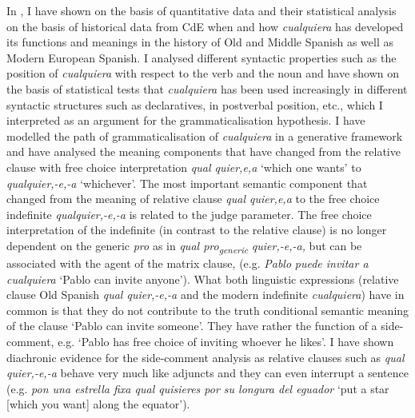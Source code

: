   In , I have shown on the basis of quantitative data and their statistical analysis on the basis of historical data from CdE when and how \textit{cualquiera} has developed its functions and meanings in the history of Old and Middle Spanish as well as Modern European Spanish. I analysed different syntactic properties such as the position of \textit{cualquiera} with respect to the verb and the noun and have shown on the basis of statistical tests that \textit{cualquiera} has been used increasingly in different syntactic structures such as declaratives, in postverbal position, etc., which I interpreted as an argument for the grammaticalisation hypothesis. I have modelled the path of grammaticalisation of \textit{cualquiera} in a generative framework and have analysed the meaning components that have changed from the relative clause with free choice interpretation \textit{qual quier,e,a} ‘which one wants’ to \textit{qualquier,-e,-a} ‘whichever’. The most important semantic component that changed from the meaning of relative clause \textit{qual quier,e,a} to the free choice indefinite \textit{qualquier,-e,-a} is related to the judge parameter. The free choice interpretation of the indefinite (in contrast to the relative clause) is no longer dependent on the generic \textit{pro} as in \textit{qual pro\textsubscript{generic}} \textit{quier,-e,-a,} but can be associated with the agent of the matrix clause, (e.g. \textit{Pablo} \textit{puede invitar a cualquiera} ‘Pablo can invite anyone’). What both linguistic expressions (relative clause Old Spanish \textit{qual quier,-e,-a} and the modern indefinite \textit{cualquiera}) have in common is that they do not contribute to the truth conditional semantic meaning of the clause ‘Pablo can invite someone’. They have rather the function of a side-comment, e.g. ‘Pablo has free choice of inviting whoever he likes’. I have shown diachronic evidence for the side-comment analysis as relative clauses such as \textit{qual quier,-e,-a} behave very much like adjuncts and they can even interrupt a sentence (e.g. \textit{pon una estrella fixa qual quisieres por su longura del eguador} ‘put a star [which you want] along the equator’).

